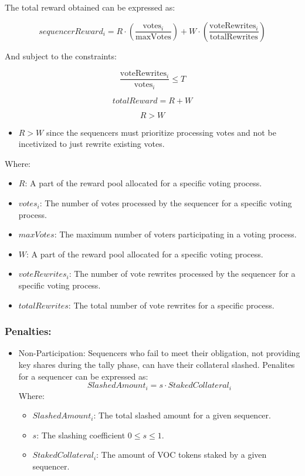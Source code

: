 The total reward obtained can be expressed as:

$$ sequencerReward_i = R \cdot \left( \frac{\text{votes}_i}{\text{maxVotes}} \right) + W \cdot \left( \frac{\text{voteRewrites}_i}{\text{totalRewrites}}  \right) $$

And subject to the constraints:

$$ \frac{\text{voteRewrites}_i}{\text{votes}_i} \leq T$$

$$ totalReward = R + W $$

$$ R > W $$

\begin{itemize}
	\item $R > W$ since the sequencers must prioritize processing votes and not be incetivized to just rewrite existing votes.
\end{itemize}

Where:

\begin{itemize}
	\item $R$: A part of the reward pool allocated for a specific voting process.
	\item $votes_i$: The number of votes processed by the sequencer for a specific voting process.
	\item $maxVotes$: The maximum number of voters participating in a voting process.
	\item $W$: A part of the reward pool allocated for a specific voting process.
	\item $voteRewrites_i$: The number of vote rewrites processed by the sequencer for a specific voting process.
	\item $totalRewrites$: The total number of vote rewrites for a specific process.
\end{itemize}

\subsubsection{Penalties:}

\begin{itemize}
	\item Non-Participation: Sequencers who fail to meet their obligation, not providing key shares during the tally phase, can have their collateral slashed.
	Penalites for a sequencer can be expressed as:
		$$ SlashedAmount_i = s \cdot StakedCollateral_i $$
		Where:
		\begin{itemize}
			\item $SlashedAmount_i$: The total slashed amount for a given sequencer.
			\item $s$: The slashing coefficient $0 \leq s \leq 1$.
			\item $StakedCollateral_i$: The amount of VOC tokens staked by a given sequencer.
		\end{itemize}
\end{itemize}

